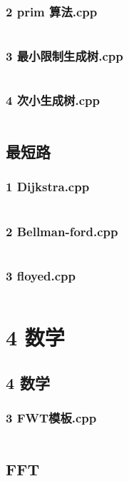 \documentclass{article}
\begin{document}
\subsubsection{2 prim 算法.cpp}
\inputminted{c++}{/home/zzuzxy/t2/ACM-template/3 图论/最小生成树/2 prim 算法.cpp}
\subsubsection{3 最小限制生成树.cpp}
\inputminted{c++}{/home/zzuzxy/t2/ACM-template/3 图论/最小生成树/3 最小限制生成树.cpp}
\subsubsection{4 次小生成树.cpp}
\inputminted{c++}{/home/zzuzxy/t2/ACM-template/3 图论/最小生成树/4 次小生成树.cpp}
\subsection{最短路}
\subsubsection{1 Dijkstra.cpp}
\inputminted{c++}{/home/zzuzxy/t2/ACM-template/3 图论/最短路/1 Dijkstra.cpp}
\subsubsection{2 Bellman-ford.cpp}
\inputminted{c++}{/home/zzuzxy/t2/ACM-template/3 图论/最短路/2 Bellman-ford.cpp}
\subsubsection{3 floyed.cpp}
\inputminted{c++}{/home/zzuzxy/t2/ACM-template/3 图论/最短路/3 floyed.cpp}
\section{4 数学}
\subsection{4 数学}
\subsubsection{3 FWT模板.cpp}
\inputminted{c++}{/home/zzuzxy/t2/ACM-template/4 数学/3 FWT模板.cpp}
\subsection{FFT}
\end{document}
